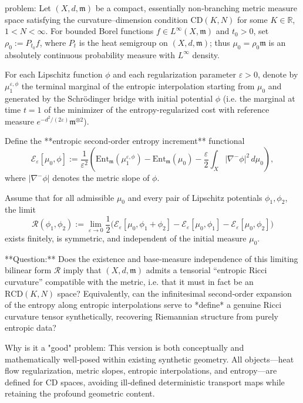 problem:  
Let \((X,d,\mathfrak{m})\) be a compact, essentially non‑branching metric measure space satisfying the curvature–dimension condition \(\mathrm{CD}(K,N)\) for some \(K\in\mathbb{R}\), \(1<N<\infty\).  
For bounded Borel functions \(f\in L^\infty(X,\mathfrak{m})\) and \(t_0>0\), set \(\rho_0 := P_{t_0}f\), where \(P_t\) is the heat semigroup on \((X,d,\mathfrak{m})\); thus \(\mu_0=\rho_0\mathfrak{m}\) is an absolutely continuous probability measure with \(L^\infty\) density.  

For each Lipschitz function \(\phi\) and each regularization parameter \(\varepsilon>0\), denote by \(\mu_1^{\varepsilon,\phi}\) the terminal marginal of the entropic interpolation starting from \(\mu_0\) and generated by the Schrödinger bridge with initial potential \(\phi\) (i.e. the marginal at time \(t=1\) of the minimizer of the entropy-regularized cost with reference measure \(e^{-d^2/(2\varepsilon)}\mathfrak{m}^{\otimes2}\)).  

Define the **entropic second‑order entropy increment** functional
\[
\mathscr{E}_\varepsilon[\mu_0,\phi]
:=
\frac{1}{\varepsilon^2}\left(
\mathrm{Ent}_{\mathfrak{m}}(\mu_1^{\varepsilon,\phi})
- \mathrm{Ent}_{\mathfrak{m}}(\mu_0)
- \frac{\varepsilon}{2}\!\int_X\! |\nabla^- \phi|^2\,d\mu_0
\right),
\]
where \(|\nabla^- \phi|\) denotes the metric slope of \(\phi\).  

Assume that for all admissible \(\mu_0\) and every pair of Lipschitz potentials \(\phi_1,\phi_2\), the limit  
\[
\mathcal{R}(\phi_1,\phi_2)
:= \lim_{\varepsilon\to0}\frac{1}{2}\Big(\mathscr{E}_\varepsilon[\mu_0,\phi_1+\phi_2]
- \mathscr{E}_\varepsilon[\mu_0,\phi_1]
- \mathscr{E}_\varepsilon[\mu_0,\phi_2]\Big)
\]
exists finitely, is symmetric, and independent of the initial measure \(\mu_0\).  

**Question:**  
Does the existence and base‑measure independence of this limiting bilinear form \(\mathcal{R}\) imply that \((X,d,\mathfrak{m})\) admits a tensorial “entropic Ricci curvature” compatible with the metric, i.e. that it must in fact be an \(\mathrm{RCD}(K,N)\) space?  
Equivalently, can the infinitesimal second‑order expansion of the entropy along entropic interpolations serve to *define* a genuine Ricci curvature tensor synthetically, recovering Riemannian structure from purely entropic data?  

Why is it a "good" problem:  
This version is both conceptually and mathematically well‑posed within existing synthetic geometry.  
All objects—heat flow regularization, metric slopes, entropic interpolations, and entropy—are defined for CD spaces, avoiding ill‑defined deterministic transport maps while retaining the profound geometric content.  

